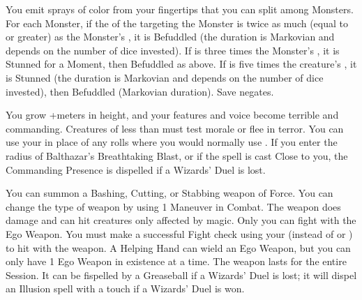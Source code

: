 {You emit \DICE sprays of color from your fingertips that you can split among \DICE Monsters.  For each Monster, if the \SUMDICE of the \DICE targeting the Monster is twice as much (equal to or greater) as the Monster's \HD, it
is Befuddled (the duration is Markovian and depends on the number of dice invested).  If \SUMDICE is three times the Monster's \HD, it is Stunned for a Moment, then Befuddled as above. If \SUMDICE is five times the creature's
\HD, it is Stunned (the duration is Markovian and depends on the number of dice invested), then Befuddled (Markovian duration).  Save negates.





\SPELL[
  Name=Commanding Presence,
  Link=wizardry-commanding-presence,
  Paradigm=Mind,
  Save=N,
  Duration=Combat or \SUMDICE Minutes,
  Counter=\mylink{Balthazar's Breathtaking Blast}{wizardry-balthazars-breathtaking-blast} ,
  Keywords=None,
  Target=Self
]

You grow +\DICE meters in height, and your features and voice become terrible and commanding.  Creatures of less than \DICE \HD must test morale or flee in terror.  You can use your \INT in place of any rolls where you
would normally use \VIG.  If you enter the radius of Balthazar's Breathtaking Blast, or if the spell is cast Close to you, the Commanding Presence is dispelled if a Wizards' Duel is lost.




\SPELL[
  Name=Ego Weapon,
  Link=wizardry-ego-weapon,
  Paradigm=Mind,
  Save=N,
  Duration=Session,
  Counter=\mylink{Greaseball}{wizardry-greaseball} ,
  Keywords=None,
  Target=Self
]



You can summon a Bashing, Cutting, or Stabbing weapon of Force.  You can change the type of weapon by using 1 Maneuver in Combat.  The weapon does \DICE damage and can hit creatures only affected by magic.  Only you can fight with the Ego Weapon.   You must make a successful
Fight check using your \INT (instead of \VIG or \DEX) to hit with the weapon.  A Helping Hand can wield an Ego Weapon, but you can only have 1 Ego Weapon in existence at a time.  The weapon lasts for the entire Session.  It can be fispelled by a Greaseball if a Wizards' Duel is lost; it will dispel an
Illusion spell with a touch if a Wizards' Duel is won.





\SPELL[
  Name=Enervate,
  Link=wizardry-enervate,
  Paradigm=Entropy,
  Save=Y (half),
  Duration=0,
  Counter=n/a ,
  Keywords=None,
  Target=Close or Nearby Magical Monster
]




}
